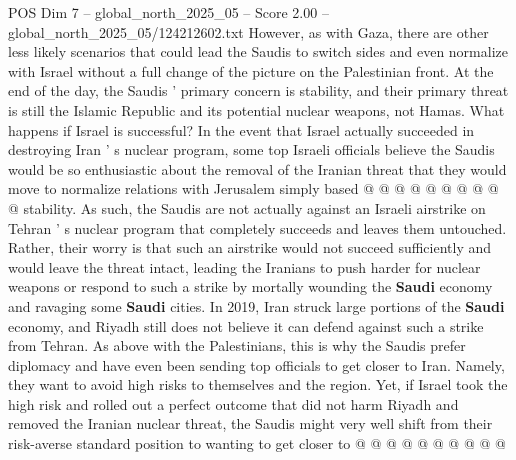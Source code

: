 \begin{textsample}{POS Dim 7 – global\_north\_2025\_05 – Score 2.00 – global\_north\_2025\_05/124212602.txt}
However, as with Gaza, there are other less likely scenarios that could lead the Saudis to switch sides and even normalize with Israel without a full change of the picture on the Palestinian front.
At the end of the day, the Saudis ' primary concern is stability, and their primary threat is still the Islamic Republic and its potential nuclear weapons, not Hamas.
What happens if Israel is successful?
In the event that Israel actually succeeded in destroying Iran ' s nuclear program, some top Israeli officials believe the Saudis would be so enthusiastic about the removal of the Iranian threat that they would move to normalize relations with Jerusalem simply based @ @ @ @ @ @ @ @ @ @ stability.
As such, the Saudis are not actually against an Israeli airstrike on Tehran ' s nuclear program that completely succeeds and leaves them untouched.
Rather, their worry is that such an airstrike would not succeed sufficiently and would leave the threat intact, leading the Iranians to push harder for nuclear weapons or respond to such a strike by mortally wounding the \textbf{Saudi} economy and ravaging some \textbf{Saudi} cities.
In 2019, Iran struck large portions of the \textbf{Saudi} economy, and Riyadh still does not believe it can defend against such a strike from Tehran.
As above with the Palestinians, this is why the Saudis prefer diplomacy and have even been sending top officials to get closer to Iran.
Namely, they want to avoid high risks to themselves and the region.
Yet, if Israel took the high risk and rolled out a perfect outcome that did not harm Riyadh and removed the Iranian nuclear threat, the Saudis might very well shift from their risk-averse standard position to wanting to get closer to @ @ @ @ @ @ @ @ @ @

\end{textsample}
